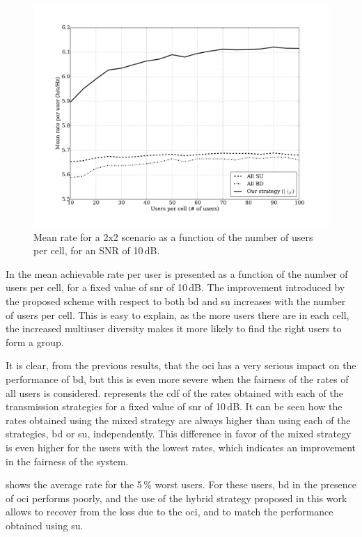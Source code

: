 \begin{figure}[t]
\centering
\includegraphics[width=0.75\columnwidth]{./12.simple_threshold_scheduling/figure/mean_rate_vs_users_02x02_s10}
\caption{Mean rate for a 2x2 scenario as a function of the number of users per cell, for an SNR of 10\,dB.}
\label{fig:mean_rate_vs_users}
\end{figure}

In  the mean achievable rate per user is presented as a function of the number of users per cell, for a fixed value of \gls{snr} of
10\,dB. The improvement introduced by the proposed scheme with respect to both
\gls{bd} and \gls{su} increases with the number of users per cell. This is easy
to explain, as the more users there are in each cell, the increased multiuser 
diversity makes it more likely to find the right users to form a group.

It is clear, from the previous results, that the \gls{oci} has a very serious
impact on the performance of \gls{bd}, but this is even more severe when the
fairness of the rates of all users is considered. 
represents the \gls{cdf} of the rates obtained with each of the transmission
strategies for a fixed value of \gls{snr} of 10\,dB. It can be seen how the
rates obtained using the mixed strategy are always higher than using each of the
strategies, \gls{bd} or \gls{su}, independently. This difference in favor of the
mixed strategy is even higher for the users with the lowest rates, which
indicates an improvement in the fairness of the system.

 shows the average rate for the 5\,\% worst users. For
these users, \gls{bd} in the presence of \gls{oci} performs poorly, and the use
of the hybrid strategy proposed in this work allows to recover from the loss due
to the \gls{oci}, and to match the performance obtained using \gls{su}.

